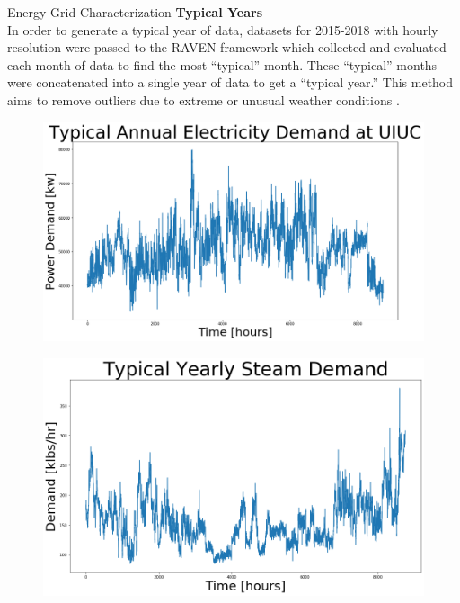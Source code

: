 \documentclass[final]{beamer}
\newlength{\onecolwid}
\newlength{\threecolwid}
\begin{document}
\begin{frame}[t]
\begin{columns}[t,totalwidth=\threecolwid]
\begin{column}{\onecolwid}
\begin{block}{Energy Grid Characterization}
\vspace{1cm}
\textbf{Typical Years}\\

In order to generate a typical year of data, datasets for 2015-2018 with hourly resolution were passed
to the RAVEN framework which collected and evaluated each month of data to find the most ``typical'' 
month. These ``typical'' months were concatenated into a single year of data to get a ``typical year.''
This method aims to remove outliers due to extreme or unusual weather conditions \cite{alfonsi_raven_2016}\cite{baker_optimal_2018}. 

\vspace{0.7em}
\begin{figure}
	\centering
	\begin{minipage}{0.23\linewidth}
		\centering
		\label{fig:load}
		\includegraphics[width=\linewidth]{../figures/typical_demand.png}
	\end{minipage}
	\begin{minipage}{0.23\linewidth}
		\centering
		\label{fig:steam}
		\includegraphics[width=\linewidth]{../figures/typical_steam.png}

\end{minipage}
\end{figure}
\end{block}
\end{column}
\end{columns}
\end{frame}
\end{document}
